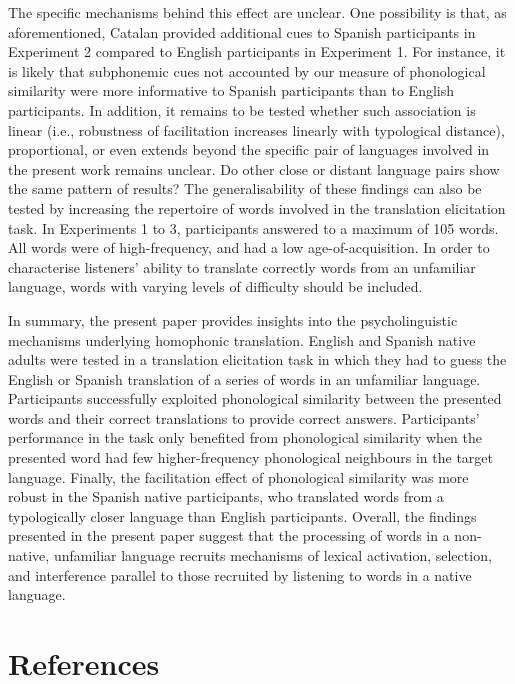 \documentclass[
]{article}
\begin{document}
The specific mechanisms behind this effect are unclear. One possibility
is that, as aforementioned, Catalan provided additional cues to Spanish
participants in Experiment 2 compared to English participants in
Experiment 1. For instance, it is likely that subphonemic cues not
accounted by our measure of phonological similarity were more
informative to Spanish participants than to English participants. In
addition, it remains to be tested whether such association is linear
(i.e., robustness of facilitation increases linearly with typological
distance), proportional, or even extends beyond the specific pair of
languages involved in the present work remains unclear. Do other close
or distant language pairs show the same pattern of results? The
generalisability of these findings can also be tested by increasing the
repertoire of words involved in the translation elicitation task. In
Experiments 1 to 3, participants answered to a maximum of 105 words. All
words were of high-frequency, and had a low age-of-acquisition. In order
to characterise listeners' ability to translate correctly words from an
unfamiliar language, words with varying levels of difficulty should be
included.

In summary, the present paper provides insights into the
psycholinguistic mechanisms underlying homophonic translation. English
and Spanish native adults were tested in a translation elicitation task
in which they had to guess the English or Spanish translation of a
series of words in an unfamiliar language. Participants successfully
exploited phonological similarity between the presented words and their
correct translations to provide correct answers. Participants'
performance in the task only benefited from phonological similarity when
the presented word had few higher-frequency phonological neighbours in
the target language. Finally, the facilitation effect of phonological
similarity was more robust in the Spanish native participants, who
translated words from a typologically closer language than English
participants. Overall, the findings presented in the present paper
suggest that the processing of words in a non-native, unfamiliar
language recruits mechanisms of lexical activation, selection, and
interference parallel to those recruited by listening to words in a
native language.

\section{References}\label{references}
\end{document}

